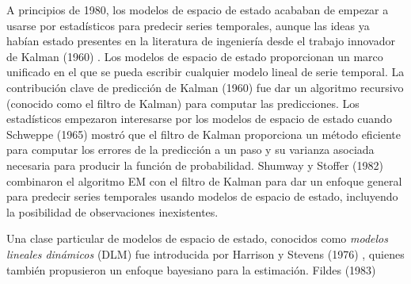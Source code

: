 \documentclass{llncs}
\begin{document}
A principios de  1980, los modelos de espacio de estado acababan de empezar a usarse por estadísticos para predecir series temporales, aunque las ideas ya habían estado presentes en la literatura de ingeniería desde el trabajo innovador de Kalman (1960) \cite{-}. Los modelos de espacio de estado proporcionan un marco unificado en el que se pueda escribir cualquier modelo lineal de serie temporal. La contribución clave de predicción de Kalman (1960) fue dar un  algoritmo recursivo (conocido como el filtro de Kalman) para computar las predicciones. Los estadísticos empezaron interesarse por los modelos de espacio de estado cuando Schweppe (1965) \cite{-} mostró que el filtro de Kalman proporciona un método eficiente para computar los errores de la predicción a un paso y su varianza asociada necesaria para producir la función de probabilidad. Shumway y Stoffer (1982) combinaron el algoritmo EM con el filtro de Kalman para dar un enfoque general para predecir series temporales usando modelos de espacio de estado, incluyendo la posibilidad de observaciones inexistentes.


Una clase particular de modelos de espacio de estado, conocidos como \emph{modelos lineales dinámicos} (DLM) fue introducida por Harrison y Stevens (1976) \cite{-}, quienes también propusieron un enfoque bayesiano para la estimación. Fildes (1983)










\end{document}
